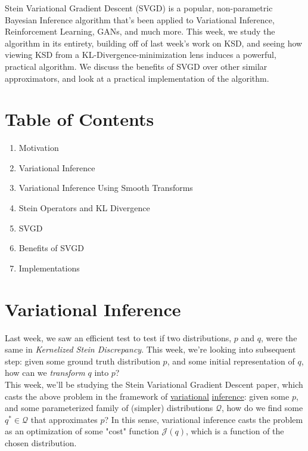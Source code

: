 \documentclass[12pt]{article}
\begin{document}
	\MakeScribeTop


Stein Variational Gradient Descent (SVGD) is a popular, non-parametric Bayesian Inference algorithm that’s been applied to Variational Inference, Reinforcement Learning, GANs, and much more. This week, we study the algorithm in its entirety, building off of last week’s work on KSD, and seeing how viewing KSD from a KL-Divergence-minimization lens induces a powerful, practical algorithm. We discuss the benefits of SVGD over other similar approximators, and look at a practical implementation of the algorithm.

\section{Table of Contents}

\begin{enumerate}
    \item Motivation
    \item Variational Inference
    \item Variational Inference Using Smooth Transforms
    \item Stein Operators and KL Divergence
    \item SVGD
    \item Benefits of SVGD
    \item Implementations
\end{enumerate}

\section{Variational Inference}

Last week, we saw an efficient test to test if two distributions, $p$ and $q$, were the same in \textit{Kernelized Stein Discrepancy}. This week, we're looking into subsequent step: given some ground truth distribution $p$, and some initial representation of $q$, how can we \textit{transform} $q$ into $p$? \\

\noindent This week, we'll be studying the Stein Variational Gradient Descent paper, which casts the above problem in the framework of \href{https://ermongroup.github.io/cs228-notes/inference/variational/}{variational} \href{https://arxiv.org/abs/1601.00670}{inference}: given some $p$, and some parameterized family of (simpler) distributions $\mathcal{Q}$, how do we find some $q^* \in \mathcal{Q}$ that approximates $p$? In this sense, variational inference casts the problem as an optimization of some "cost" function $\mathcal{J}(q)$, which is a function of the chosen distribution. \\
\end{document}
